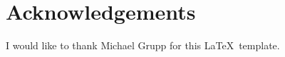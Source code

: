 \chapter{Acknowledgements}

I would like to thank Michael Grupp for this \LaTeX\ template.

\lipsum[1-2]
